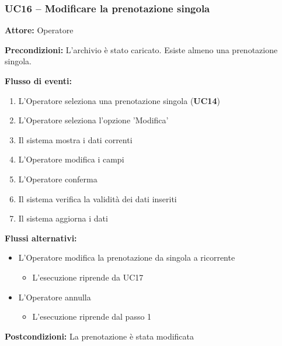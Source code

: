 \documentclass[a4paper,11pt]{article}
\begin{document}
\begin{samepage}
\subsubsection*{UC16 -- Modificare la prenotazione singola}
\begin{ucbox}

\noindent\textbf{Attore:} Operatore\par
\noindent\textbf{Precondizioni:} L'archivio è stato caricato. Esiste almeno una prenotazione singola.\par

\noindent\textbf{Flusso di eventi:}
\begin{enumerate}
\item L'Operatore seleziona una prenotazione singola (\textbf{UC14})\item L'Operatore seleziona l'opzione 'Modifica' \item Il sistema mostra i dati correnti \item L'Operatore modifica i campi \item L'Operatore conferma \item Il sistema verifica la validità dei dati inseriti \item Il sistema aggiorna i dati \end{enumerate}
\noindent\textbf{Flussi alternativi:}
\begin{itemize}
\item[4a.] L'Operatore modifica la prenotazione da singola a ricorrente
\begin{itemize}
\item L'esecuzione riprende da UC17
\end{itemize}
\item[5a.] L'Operatore annulla
\begin{itemize}
\item L'esecuzione riprende dal passo 1
\end{itemize}
\end{itemize}
\noindent\textbf{Postcondizioni:} La prenotazione è stata modificata\par
\end{ucbox}
\end{samepage}
\end{document}
